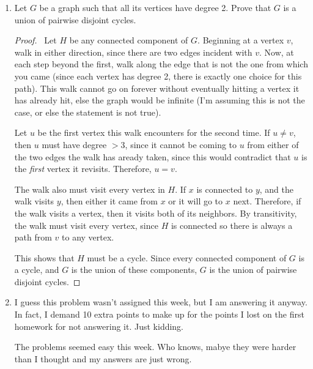 \documentclass[12pt]{article}
\begin{document}
\begin{enumerate}[leftmargin=0cm,itemindent=.5cm,labelwidth=\itemindent,labelsep=0cm,align=left]
\begin{proof}
So the number of elements in none of the $E_i$, which is the number of ways to have no couple sitting together, is
\begin{align*}
|S| - |E_1 \cup \cdots \cup E_n|
&= |S| - \sum_{k=1}^n (-1)^{k-1} \binom{n}{k} |E_1 \cap \cdots \cap E_k|
\\
&= (2n)! - \sum_{k=1}^n (-1)^{k-1} \binom{n}{k} 2^{k+1}k!(2n-2k)! \binom{2n-k-1}{k-1}
\\
&= (2n)! - \sum_{k=1}^n (-1)^{k-1} \binom{n}{k} \dfrac{(2n-k-1)!}{(2n-2k)!(k-1)!}(2n-2k)!k! 2^{k+1}
\\
&= (2n)! - \sum_{k=1}^n (-1)^{k-1} \binom{n}{k} (2n-k-1)! 2^{k+1}k
\end{align*}
\end{proof}

\item Let $G$ be a graph such that all its vertices have degree 2. Prove that $G$ is a union of pairwise disjoint cycles.

\begin{proof}
\ Let $H$ be any connected component of $G$.  Beginning at a vertex $v$, walk in either direction, since there are two edges incident with $v$.  Now, at each step beyond the first, walk along the edge that is not the one from which you came (since each vertex has degree 2, there is exactly one choice for this path).  This walk cannot go on forever without eventually hitting a vertex it has already hit, else the graph would be infinite (I'm assuming this is not the case, or else the statement is not true).

Let $u$ be the first vertex this walk encounters for the second time.  If $u \neq v$, then $u$ must have degree $>3$, since it cannot be coming to $u$ from either of the two edges the walk has aready taken, since this would contradict that $u$ is the \emph{first} vertex it revisits.  Therefore, $u = v$.

The walk also must visit every vertex in $H$.  If $x$ is connected to $y$, and the walk visits $y$, then either it came from $x$ or it will go to $x$ next.  Therefore, if the walk visits a vertex, then it visits both of its neighbors.  By transitivity, the walk must visit every vertex, since $H$ is connected so there is always a path from $v$ to any vertex.

This shows that $H$ must be a cycle.  Since every connected component of $G$ is a cycle, and $G$ is the union of these components, $G$ is the union of pairwise disjoint cycles.
\end{proof}

\item I guess this problem wasn't assigned this week, but I am answering it anyway.  In fact, I demand 10 extra points to make up for the points I lost on the first homework for not answering it.  Just kidding.

The problems seemed easy this week.  Who knows, mabye they were harder than I thought and my answers are just wrong.

\end{enumerate}
\end{document}
